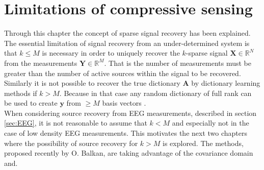 \section{Limitations of compressive sensing}
Through this chapter the concept of sparse signal recovery has been explained. 
The essential limitation of signal recovery from an under-determined system is that $k\leq M$ is necessary in order to uniquely recover the $k$-sparse signal $\textbf{X}\in \mathbb{R}^N$ from the measurements $\textbf{Y} \in \mathbb{R}^M$. 
That is the number of measurements must be greater than the number of active sources within the signal to be recovered.  
Similarly it is not possible to recover the true dictionary $\textbf{A}$ by dictionary learning methods if $k>M$. 
Because in that case any random dictionary of full rank can be used to create $\textbf{y}$ from $\geq M$ basis vectors \cite[p. 30]{phd2015}. 
\\
When considering source recovery from EEG measurements, described in section \ref{sec:EEG}, it is not reasonable to assume that $k<M$ and especially not in the case of low density EEG measurements. 
This motivates the next two chapters where the possibility of source recovery for $k>M$ is explored. 
The methods, proposed recently by O. Balkan, are taking advantage of the covariance domain and.




